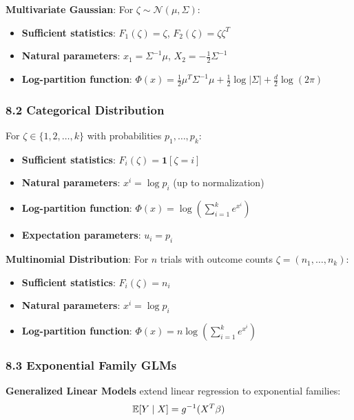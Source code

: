 \documentclass{amsart}
\let\originalmathbb\mathbb
\renewcommand{\mathbb}[1]{%
    \ifstrequal{#1}{1}{\mathbbm{#1}}{\originalmathbb{#1}}%
}
\theoremstyle{plain}
\theoremstyle{definition}
\theoremstyle{remark}
\begin{document}
\textbf{Multivariate Gaussian}:
For $\zeta \sim \mathcal{N}(\mu, \Sigma)$:

\begin{itemize}
	\item \textbf{Sufficient statistics}: $F_1(\zeta) = \zeta$, $F_2(\zeta) = \zeta \zeta^T$
	\item \textbf{Natural parameters}: $x_1 = \Sigma^{-1}\mu$, $X_2 = -\frac{1}{2}\Sigma^{-1}$
	\item \textbf{Log-partition function}: $\Phi(x) = \frac{1}{2}\mu^T\Sigma^{-1}\mu + \frac{1}{2}\log|\Sigma| + \frac{d}{2}\log(2\pi)$
\end{itemize}

\subsubsection{8.2 Categorical Distribution}

For $\zeta \in \{1, 2, \ldots, k\}$ with probabilities $p_1, \ldots, p_k$:

\begin{itemize}
	\item \textbf{Sufficient statistics}: $F_i(\zeta) = \mathbf{1}[\zeta = i]$
	\item \textbf{Natural parameters}: $x^i = \log p_i$ (up to normalization)
	\item \textbf{Log-partition function}: $\Phi(x) = \log\left(\sum_{i=1}^k e^{x^i}\right)$
	\item \textbf{Expectation parameters}: $u_i = p_i$
\end{itemize}

\textbf{Multinomial Distribution}:
For $n$ trials with outcome counts $\zeta = (n_1, \ldots, n_k)$:

\begin{itemize}
	\item \textbf{Sufficient statistics}: $F_i(\zeta) = n_i$
	\item \textbf{Natural parameters}: $x^i = \log p_i$
	\item \textbf{Log-partition function}: $\Phi(x) = n \log\left(\sum_{i=1}^k e^{x^i}\right)$
\end{itemize}

\subsubsection{8.3 Exponential Family GLMs}

\textbf{Generalized Linear Models} extend linear regression to exponential families:
\[
\mathbb{E}[Y \mid X] = g^{-1}(X^T \beta)
\]
\end{document}
